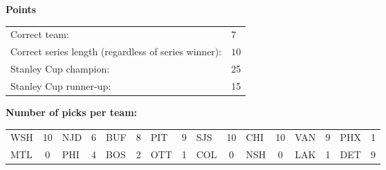 \documentclass[10pt]{article}
\begin{document}
{\bf Points}\\
\begin{minipage}{12cm}
    \begin{tabular}{l l}
        Correct team:	& $7$\\
        Correct series length (regardless of series winner):	& $10$\\
        Stanley Cup champion:	& 25\\
        Stanley Cup runner-up:	& 15\\
    \end{tabular}

    \vspace{1cm}
    {\bf Number of picks per team:}\\
    \begin{tabular}{lc | lc | lc | lc | lc | lc | lc | lc }
        WSH & 10 & NJD & 6 & BUF & 8 & PIT & 9 & SJS & 10 & CHI & 10 & VAN & 9 & PHX & 1 \\
        MTL & 0 & PHI & 4 & BOS & 2 & OTT & 1 & COL & 0 & NSH & 0 & LAK & 1 & DET & 9 \\
    \end{tabular}
\end{minipage}
\end{document}
